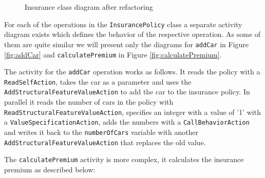 \documentclass{llncs}
\begin{document}
\begin{figure}[h!t]
 \centering
 \caption{Insurance class diagram after refactoring}
 \label{fig:classdiagramcomplexRef}
\end{figure}

For each of the operations in the \texttt{InsurancePolicy} class a separate activity diagram exists which defines the behavior 
of the respective operation. As some of them are quite similar we will present only the diagrams for \texttt{addCar} in Figure 
\ref{fig:addCar} and \texttt{calculatePremium} in  Figure \ref{fig:calculatePremium}.

The activity for the \texttt{addCar} operation works as follows. It reads the policy with a \texttt{Read\-Self\-Action}, takes the 
car as a parameter and uses the \texttt{Add\-Structural\-Feature\-Value\-Action} to add the car to the insurance policy. In parallel 
it reads the number of cars in the policy with \texttt{Read\-Structural\-Feature\-Value\-Action}, specifies an integer
with a value of '1' with 
a \texttt{Value\-Specification\-Action}, adds the numbers with a \texttt{Call\-Behavior\-Action} and writes it back to the 
\texttt{numberOfCars} variable with another \texttt{Add\-Structural\-Feature\-Value\-Action} that replaces the old value.

The \texttt{calculatePremium} activity is more complex, it calculates the insurance premium as described below:
\end{document}
